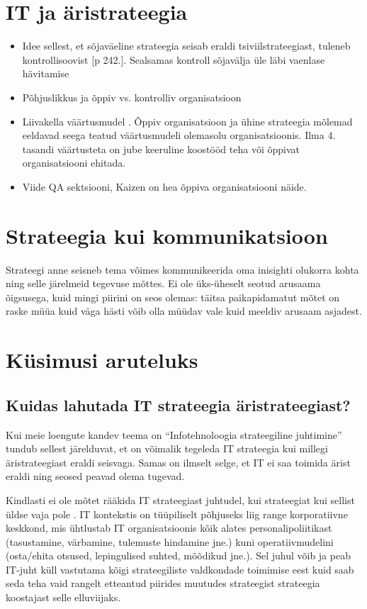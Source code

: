\section{IT ja äristrateegia}
\begin{itemize}
	\item Idee sellest, et sõjaväeline strateegia seisab eraldi tsiviilstrateegiast, tuleneb kontrollisoovist \cite{freedman2013strategy} [p 242.]. Sealsamas kontroll sõjavälja üle läbi vaenlase hävitamise
	\item Põhjuslikkus ja õppiv vs. kontrolliv organisatsioon \cite{senge19905th}
	\item Liivakella väärtusmudel \cite{hing}. Õppiv organisatsioon ja ühine strateegia mõlemad eeldavad seega teatud väärtusmudeli olemasolu organisatsioonis. Ilma 4. tasandi väärtusteta on jube keeruline koostööd teha või õppivat organisatsiooni ehitada. 
	\item Viide QA sektsiooni, Kaizen on hea õppiva organisatsiooni näide.
\end{itemize}

\section{Strateegia kui kommunikatsioon}
Strateegi anne seisneb tema võimes kommunikeerida oma inisighti olukorra kohta ning selle järelmeid tegevuse mõttes. Ei ole üks-üheselt seotud arusaama õigsusega, kuid mingi piirini on seos olemas: täitsa paikapidamatut mõtet on raske müüa kuid väga hästi võib olla müüdav vale kuid meeldiv arusaam asjadest.

\section{Küsimusi aruteluks}
\subsection{Kuidas lahutada IT strateegia äristrateegiast?}
\label{sec:strategy:q1}
Kui meie loengute kandev teema on \enquote{Infotehnoloogia strateegiline juhtimine} tundub sellest järelduvat, et on võimalik tegeleda IT strateegia kui millegi äristrateegiast eraldi seisvaga. Samas on ilmselt selge, et IT ei saa toimida ärist eraldi ning seosed peavad olema tugevad.

Kindlasti ei ole mõtet rääkida IT strateegiast juhtudel, kui strateegiat kui sellist üldse vaja pole . IT kontekstis on tüüpiliselt põhjuseks liig range korporatiivne keskkond, mis ühtlustab IT organisatsioonis kõik alates personalipoliitikast (tasustamine, värbamine, tulemuste hindamine jne.) kuni operatiivmudelini (osta/ehita otsused, lepingulised suhted, mõõdikud jne.). Sel juhul võib ja peab IT-juht küll vastutama kõigi strateegiliste valdkondade toimimise eest kuid saab seda teha vaid rangelt etteantud piirides muutudes strateegist strateegia koostajast selle elluviijaks.

